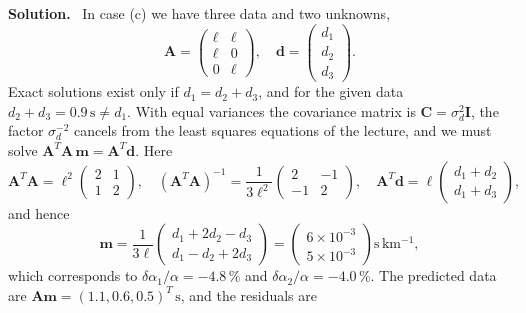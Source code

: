 \documentclass[a4paper,12pt]{paper}
\newenvironment{solution}{\par\noindent\textbf{Solution.}\ }{\par\medskip}
\begin{document}
\begin{solution}
In case (c) we have three data and two unknowns,
\begin{equation}
    \mathbf{A} = \begin{pmatrix} \ell & \ell \\ \ell & 0 \\ 0 & \ell \end{pmatrix},\quad
    \mathbf{d} = \begin{pmatrix} d_{1} \\ d_{2} \\ d_{3} \end{pmatrix}.
    \label{eq:7}
\end{equation}
Exact solutions exist only if $d_{1}=d_{2}+d_{3}$, and for the given data $d_{2}+d_{3}=0.9\,\mathrm{s}
\neq d_{1}$. With equal variances the covariance matrix is $\mathbf{C}=\sigma_{d}^{2}\mathbf{I}$, the
factor $\sigma_{d}^{-2}$ cancels from the least squares equations of the lecture, and we must solve
$\mathbf{A}^{T}\mathbf{A}\,\mathbf{m} = \mathbf{A}^{T}\mathbf{d}$. Here
\begin{equation}
    \mathbf{A}^{T}\mathbf{A} = \ell^{2}\begin{pmatrix} 2 & 1 \\ 1 & 2 \end{pmatrix},\quad
    (\mathbf{A}^{T}\mathbf{A})^{-1} = \frac{1}{3\ell^{2}}\begin{pmatrix} 2 & -1 \\ -1 & 2 \end{pmatrix},\quad
    \mathbf{A}^{T}\mathbf{d} = \ell\begin{pmatrix} d_{1}+d_{2} \\ d_{1}+d_{3} \end{pmatrix},
    \label{eq:8}
\end{equation}
and hence
\begin{equation}
    \mathbf{m} = \frac{1}{3\ell}\begin{pmatrix} d_{1}+2d_{2}-d_{3} \\ d_{1}-d_{2}+2d_{3} \end{pmatrix}
    = \begin{pmatrix} 6\times10^{-3} \\ 5\times10^{-3} \end{pmatrix}\mathrm{s\,km^{-1}},
    \label{eq:9}
\end{equation}
which corresponds to $\delta\alpha_{1}/\alpha=-4.8\,\%$ and $\delta\alpha_{2}/\alpha=-4.0\,\%$. The
predicted data are $\mathbf{A}\mathbf{m} = (1.1, 0.6, 0.5)^{T}\,\mathrm{s}$, and the residuals are
\begin{equation}

\end{equation}
\end{solution}
\end{document}
